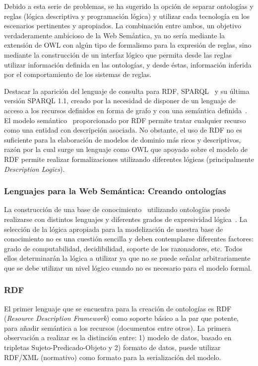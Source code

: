 Debido a esta serie de problemas, se ha sugerido la opción de separar ontologías y
reglas (lógica descriptiva y programación lógica) y utilizar cada tecnología en los escenarios pertinentes y apropiados. La combinación entre ambos, un objetivo verdaderamente ambicioso de la Web Semántica, 
ya no sería mediante la extensión de OWL con algún tipo de formalismo para la expresión de reglas, sino mediante la construcción
de un interfaz lógico que permita desde las reglas utilizar información definida
en las ontologías, y desde éstas, información inferida por el
comportamiento de los sistemas de reglas.

Destacar la aparición del lenguaje de consulta para RDF, \gls{SPARQL}~\cite{Sparql} y su última
versión SPARQL 1.1, creado por la necesidad de disponer de un lenguaje de acceso a los recursos
definidos en forma de grafo y con una semántica definida~\cite{Perez:2009:SCS:1567274.1567278}. El modelo semántico~\cite{citeulike:1556975} 
proporcionado por RDF permite tratar cualquier recurso como una entidad con descripción asociada. No obstante, el uso de RDF no es
suficiente para la elaboración de modelos de dominio más ricos y descriptivos, razón por la cual surge un lenguaje como OWL que apoyado sobre el modelo de RDF
permite realizar formalizaciones utilizando diferentes lógicas (principalmente \textit{Description Logics}).

\subsubsection{Lenguajes para la Web Semántica: Creando ontologías}\label{lenguajes}
La construcción de una base de conocimiento~\cite{GruberOnto} utilizando ontologías puede
realizarse con distintos lenguajes y diferentes grados de expresividad lógica~\cite{HoPa10a,Kifer:1989:FHL:66926.66939}.
La selección de la lógica apropiada para la modelización de nuestra base de
conocimiento no es una cuestión sencilla y deben contemplarse diferentes
factores: grado de computabilidad, decidibilidad, soporte de los razonadores, etc. Todos ellos determinarán la lógica a utilizar ya que no se puede señalar arbitrariamente que se debe utilizar un nivel lógico cuando no es necesario para
el modelo formal.
\subsubsection{RDF}\label{rdf}
El primer lenguaje que se encuentra para la creación de ontologías es \gls{RDF}
(\textit{Resource Description Framework}) como soporte básico a la par que potente, 
para añadir semántica a los recursos (documentos entre otros). La primera observación 
a realizar es la distinción entre: 1) modelo de datos, basado en
tripletas Sujeto-Predicado-Objeto y 2) formato de datos, puede utilizar RDF/XML (normativo)
como formato para la serialización del modelo.

